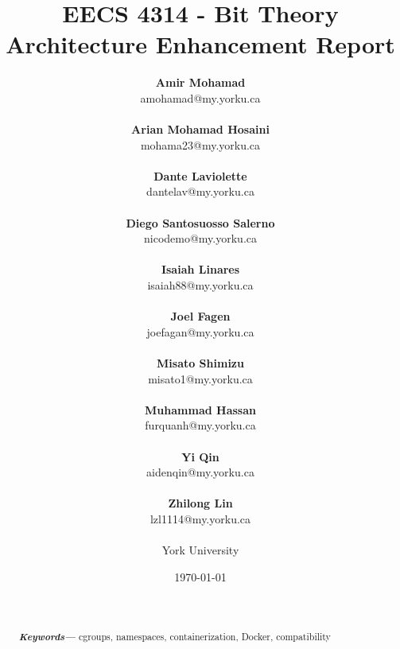\documentclass[12pt, dvipsnames, a4paper]{article}
\providecommand{\keywords}[1]
{
  \small	
  \textbf{\textit{Keywords---}} #1
}
\begin{document}
\title{\textbf{EECS 4314 - Bit Theory\\Architecture Enhancement Report}}
\date{\Large \today}
\author{
	\large \textbf{Amir Mohamad}\\ \small amohamad@my.yorku.ca\\\\
	\large \textbf{Arian Mohamad Hosaini}\\ \small mohama23@my.yorku.ca\\\\
	\large \textbf{Dante Laviolette}\\ \small dantelav@my.yorku.ca\\\\
	\large \textbf{Diego Santosuosso Salerno}\\ \small nicodemo@my.yorku.ca\\\\
	\large \textbf{Isaiah Linares}\\ \small isaiah88@my.yorku.ca\\\\
	\large \textbf{Joel Fagen}\\ \small joefagan@my.yorku.ca\\\\
	\large \textbf{Misato Shimizu}\\ \small misato1@my.yorku.ca\\\\
	\large \textbf{Muhammad Hassan}\\ \small furquanh@my.yorku.ca\\\\
	\large \textbf{Yi Qin}\\ \small aidenqin@my.yorku.ca\\\\
	\large \textbf{Zhilong Lin}\\ \small lzl1114@my.yorku.ca\\\\
	\large York University\\
}
\maketitle
\newpage
\hspace{0pt}
\vfill
\begin{abstract}
	\lipsum[1]
	\lipsum[1]
	\\\\
	\keywords{cgroups, namespaces, containerization, Docker, compatibility}
\end{abstract}
\vfill
\hspace{0pt}
\newpage
\tableofcontents
\clearpage
\end{document}
